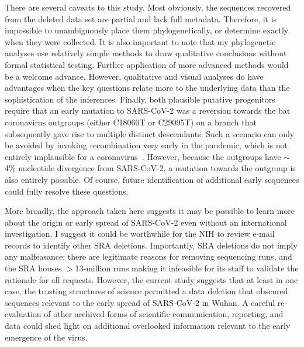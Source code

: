 \documentclass[9pt,twocolumn,twoside]{gsajnl_modified}
\begin{document}
There are several caveats to this study.
Most obviously, the sequences recovered from the deleted data set are partial and lack full metadata.
Therefore, it is impossible to unambiguously place them phylogenetically, or determine exactly when they were collected.
It is also important to note that my phylogenetic analyses use relatively simple methods to draw qualitative conclusions without formal statistical testing.
Further application of more advanced methods would be a welcome advance.
However, qualitative and visual analyses do have advantages when the key questions relate more to the underlying data than the sophistication of the inferences.
Finally, both plausible putative progenitors require that an early mutation to SARS-CoV-2 was a reversion towards the bat coronavirus outgroups (either C18060T or C29095T) on a branch that subsequently gave rise to multiple distinct descendants.
Such a scenario can only be avoided by invoking recombination very early in the pandemic, which is not entirely implausible for a coronavirus~\citep{boni2020evolutionary}.
However, because the outgroups have $\sim$4\% nucleotide divergence from SARS-CoV-2, a mutation towards the outgroup is also entirely possible.
Of course, future identification of additional early sequences could fully resolve these questions.

More broadly, the approach taken here suggests it may be possible to learn more about the origin or early spread of SARS-CoV-2 even without an international investigation.
I suggest it could be worthwhile for the NIH to review e-mail records to identify other SRA deletions.
Importantly, SRA deletions do not imply any malfeasance: there are legitimate reasons for removing sequencing runs, and the SRA houses $>$13-million runs making it infeasible for its staff to validate the rationale for all requests.
However, the current study suggests that at least in one case, the trusting structures of science permitted a data deletion that obscured sequences relevant to the early spread of SARS-CoV-2 in Wuhan.
A careful re-evaluation of other archived forms of scientific communication, reporting, and data could shed light on additional overlooked information relevant to the early emergence of the virus.
\end{document}
